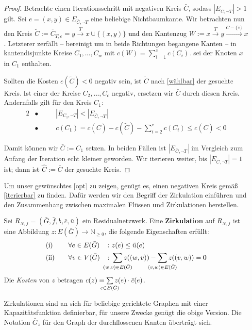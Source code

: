 \begin{proof}
Betrachte einen Iterationsschritt mit negativen Kreis $\bar{C}$, sodass $|E_{\bar{C},\neg T}|>1$ gilt. Sei $e=(x,y)\in E_{\bar{C},\neg T}$ eine beliebige Nichtbaumkante. Wir betrachten nun den Kreis $\tilde{C}:=\bar{C}_{T,e}=y\xrightarrow{T}x\cup\{(x,y)\}$ und den Kantenzug $W:=x\xrightarrow{T}y\xrightarrow{\bar{C}-\{e\}}x$. Letzterer zerfällt -- bereinigt um in beide Richtungen begangene Kanten -- in kantendisjunkte Kreise $C_1,\ldots,C_w$ mit $c(W)=\sum_{i=1}^{c} c(C_i)$. \Obda sei der Knoten $x$ in $C_1$ enthalten.

Sollten die Kosten $c(\tilde{C})<0$ negativ sein, ist $\tilde{C}$ nach \cref{wählbar} der gesuchte Kreis. Ist einer der Kreise $C_2,\ldots,C_c$ negativ, ersetzen wir $\bar{C}$ durch diesen Kreis. Andernfalls gilt für den Kreis $C_1$:
\begin{alignat*}{2}
&\bullet\quad&&|E_{C_1,\neg T}|<|E_{\bar{C},\neg T}|\\
&\bullet\quad&&c(C_1)=c(\bar{C})-c(\tilde{C})-\sum_{i=2}^{c}c(C_i)\leq c(\bar{C})<0
\end{alignat*}

Damit können wir $\bar{C}:=C_1$ setzen. In beiden Fällen ist $|E_{\bar{C},\neg T}|$ im Vergleich zum Anfang der Iteration echt kleiner geworden. Wir iterieren weiter, bis $|E_{\bar{C},\neg T}|=1$ ist; dann ist $\hat{C}:=\bar{C}$ der gesuchte Kreis.\end{proof}

Um unser gewünschtes \cref{opt} zu zeigen, genügt es, einen negativen Kreis gemäß \cref{iterierbar} zu finden. Dafür werden wir den Begriff der Zirkulation einführen und den Zusammenhang zwischen maximalen Flüssen und Zirkulationen herstellen.

\begin{defn}\label{zirk}Sei $R_{N,f}= (\bar{G},\bar{f},b,\bar{c},\bar{u})$ ein Residualnetzwerk. Eine \textbf{Zirkulation} auf $R_{N,f}$ ist eine Abbildung $z \colon E(\bar{G})\rightarrow\mathbb{N}_{\geq0}$, die folgende Eigenschaften erfüllt:
\begin{alignat}{3}
&\text{(i)}\quad&&\forall e\in E(\bar{G}) &&\colon z(e)\leq \bar{u}(e)\label{zirkI}\\
&\text{(ii)}\quad&&\forall v\in V(\bar{G}) &&\colon \sum_{\mathclap{(w,v)\in E(\bar{G})}} z((w,v)) - \sum_{\mathclap{(v,w)\in E(\bar{G})}} z((v,w)) = 0\label{zirkII}
\end{alignat}
Die \emph{Kosten} von $z$ betragen $c(z) = \sum\limits_{\mathclap{e\in E(\bar{G})}} z(e)\cdot \bar{c}(e)$.
\end{defn}
\begin{anm}Zirkulationen sind an sich für beliebige gerichtete Graphen mit einer Kapazitätsfunktion definierbar, für unsere Zwecke genügt die obige Version. Die Notation $\bar{G}_z$ für den Graph der durchflossenen Kanten überträgt sich.\end{anm}

